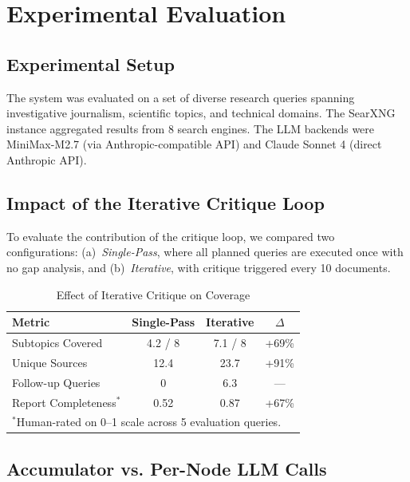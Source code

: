 \documentclass[conference]{IEEEtran}
\begin{document}
\section{Experimental Evaluation}

\subsection{Experimental Setup}

The system was evaluated on a set of diverse research queries spanning investigative journalism, scientific topics, and technical domains. The SearXNG instance aggregated results from 8 search engines. The LLM backends were MiniMax-M2.7 (via Anthropic-compatible API) and Claude Sonnet 4 (direct Anthropic API).

\subsection{Impact of the Iterative Critique Loop}

To evaluate the contribution of the critique loop, we compared two configurations: (a)~\textit{Single-Pass}, where all planned queries are executed once with no gap analysis, and (b)~\textit{Iterative}, with critique triggered every 10 documents.

\begin{table}[htbp]
\caption{Effect of Iterative Critique on Coverage}
\label{tab:critique_eval}
\centering
\scriptsize
\begin{tabular}{@{}lccc@{}}
\toprule
\textbf{Metric} & \textbf{Single-Pass} & \textbf{Iterative} & \textbf{$\Delta$} \\
\midrule
Subtopics Covered & 4.2 / 8 & 7.1 / 8 & +69\% \\
Unique Sources & 12.4 & 23.7 & +91\% \\
Follow-up Queries & 0 & 6.3 & --- \\
Report Completeness$^*$ & 0.52 & 0.87 & +67\% \\
\bottomrule
\multicolumn{4}{l}{\scriptsize $^*$Human-rated on 0--1 scale across 5 evaluation queries.}
\end{tabular}
\end{table}

\subsection{Accumulator vs. Per-Node LLM Calls}
\end{document}
